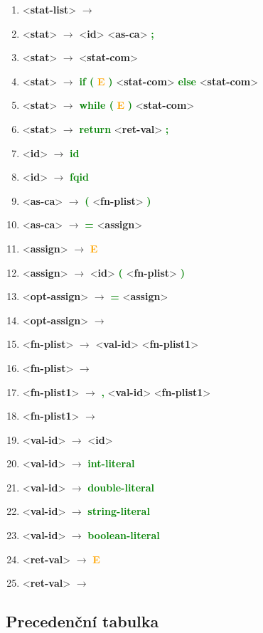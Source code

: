 \documentclass[a4paper, 11pt]{article}
\providecommand{\nonterm}[1]{\textless \textbf{#1}\textgreater}
\providecommand{\term}[1]{\textcolor{Green}{\textbf{#1}}}
\providecommand{\arrow}{ $\rightarrow$ }
\providecommand{\E}{ \textcolor{Orange}{\textbf{E}}}
\providecommand{\eps}{ \textcolor{Red}{\textbf{\textepsilon}}}
\begin{document}
\begin{enumerate}[itemsep=0mm]
        \item\nonterm{stat-list}\arrow\eps
        \item\nonterm{stat}\arrow\nonterm{id} \nonterm{as-ca} \term{;}
        \item\nonterm{stat}\arrow\nonterm{stat-com}
        \item\nonterm{stat}\arrow\term{if (}\E\term{ )} \nonterm{stat-com} \term{else} \nonterm{stat-com}
        \item\nonterm{stat}\arrow\term{while (}\E\term{ )} \nonterm{stat-com}
        \item\nonterm{stat}\arrow\term{return} \nonterm{ret-val} \term{;}
        \item\nonterm{id}\arrow\term{id}
        \item\nonterm{id}\arrow\term{fqid}
        \item\nonterm{as-ca}\arrow\term{( }\nonterm{fn-plist} \term{)}
        \item\nonterm{as-ca}\arrow\term{= }\nonterm{assign}
        \item\nonterm{assign}\arrow\E
        \item\nonterm{assign}\arrow\nonterm{id} \term{( }\nonterm{fn-plist} \term{)}
        \item\nonterm{opt-assign}\arrow\term{= }\nonterm{assign}
        \item\nonterm{opt-assign}\arrow\eps
        \item\nonterm{fn-plist}\arrow\nonterm{val-id} \nonterm{fn-plist1}
        \item\nonterm{fn-plist}\arrow\eps
        \item\nonterm{fn-plist1}\arrow\term{,} \nonterm{val-id} \nonterm{fn-plist1}
        \item\nonterm{fn-plist1}\arrow\eps
        \item\nonterm{val-id}\arrow\nonterm{id}
        \item\nonterm{val-id}\arrow\term{int-literal}
        \item\nonterm{val-id}\arrow\term{double-literal}
        \item\nonterm{val-id}\arrow\term{string-literal}
        \item\nonterm{val-id}\arrow\term{boolean-literal}
        \item\nonterm{ret-val}\arrow\E
        \item\nonterm{ret-val}\arrow\eps
    \end{enumerate}
    \newpage
    \subsection{Precedenční tabulka}
    
\end{document}
